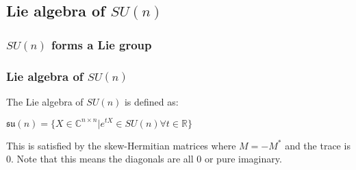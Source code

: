 \subsection{Lie algebra of \(SU(n)\)}

\subsubsection{\(SU(n)\) forms a Lie group}

\subsubsection{Lie algebra of \(SU(n)\)}

The Lie algebra of \(SU(n)\) is defined as:

\(\mathfrak{su}(n)=\{X\in \mathbb {C}^{n\times n}|e^{tX}\in SU(n) \forall t\in \mathbb{R}\}\)

This is satisfied by the skew-Hermitian matrices where \(M=-M^*\) and the trace is \(0\). Note that this means the diagonals are all \(0\) or pure imaginary.

